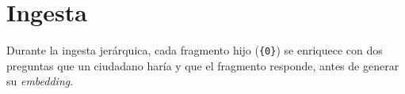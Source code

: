 

\section{Ingesta}

Durante la ingesta jerárquica, cada fragmento hijo (\texttt{\{0\}}) se enriquece con dos preguntas que un ciudadano haría y que el fragmento responde, antes de generar su \emph{embedding}.


